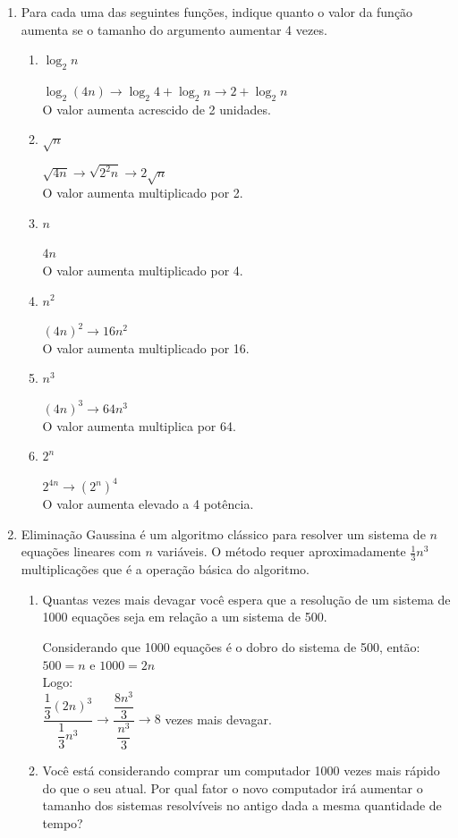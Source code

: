 \documentclass[12pt,a4paper]{article}
\begin{document}
\begin{enumerate}
	
	
	\item Para cada uma das seguintes funções, indique quanto o valor da função aumenta se o tamanho	do argumento aumentar 4 vezes.
	
	\begin{enumerate}
		\item $\log_2 n$
		
		$\log_2 (4n) \rightarrow \log_2 4 + \log_2 n \rightarrow 2 + \log_2 n$\\
		O valor aumenta acrescido de 2 unidades.	
		
		\item $\sqrt{n}$
		
		$\sqrt{4n} \rightarrow \sqrt{2^2n} \rightarrow 2\sqrt{n}$\\
		O valor aumenta multiplicado por 2.		
		
		\item $n$
		
		$4n$\\
		O valor aumenta multiplicado por 4.		
		
		\item $n^2$
		
		$(4n)^2 \rightarrow 16n^2$\\
		O valor aumenta multiplicado por 16.
		
		\item $n^3$
		
		$(4n)^3 \rightarrow 64n^3$\\
		O valor aumenta multiplica por 64.
		
		\item $2^n$
		
		$2^{4n} \rightarrow (2^n)^4$\\
		O valor aumenta elevado a 4 potência.
	\end{enumerate}



	\item Eliminação Gaussina é um algoritmo clássico para resolver um sistema de $n$ equações lineares com $n$ variáveis. O método requer aproximadamente $\frac{1}{3}n^3$ multiplicações que é a operação básica
	do algoritmo.
	\begin{enumerate}
		\item Quantas vezes mais devagar você espera que a resolução de um sistema de 1000 equações seja em relação a um sistema de 500.
		
		Considerando que 1000 equações é o dobro do sistema de 500, então:\\
		$500 = n$ e $1000 = 2n$\\
		Logo:\\
		$\dfrac{\dfrac{1}{3}(2n)^3}{\dfrac{1}{3}n^3} \rightarrow  \dfrac{\dfrac{8n^3}{3}}{\dfrac{n^3}{3}} \rightarrow 8$ vezes mais devagar.
		\item Você está considerando comprar um computador 1000 vezes mais rápido do que o seu atual. Por qual fator o novo computador irá aumentar o tamanho dos sistemas resolvíveis no antigo dada a mesma quantidade de tempo?
		

\end{enumerate}
\end{enumerate}
\end{document}
